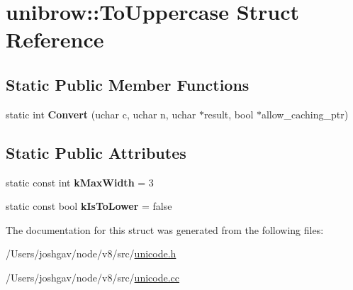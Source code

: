 \hypertarget{structunibrow_1_1_to_uppercase}{}\section{unibrow\+:\+:To\+Uppercase Struct Reference}
\label{structunibrow_1_1_to_uppercase}
\subsection*{Static Public Member Functions}
\begin{DoxyCompactItemize}
\item 
static int {\bfseries Convert} (uchar c, uchar n, uchar $\ast$result, bool $\ast$allow\+\_\+caching\+\_\+ptr)\hypertarget{structunibrow_1_1_to_uppercase_af0d9d46393e190811df7aee125999757}{}\label{structunibrow_1_1_to_uppercase_af0d9d46393e190811df7aee125999757}

\end{DoxyCompactItemize}
\subsection*{Static Public Attributes}
\begin{DoxyCompactItemize}
\item 
static const int {\bfseries k\+Max\+Width} = 3\hypertarget{structunibrow_1_1_to_uppercase_aeb0ac39ab96dff4ae331cee78b32a30f}{}\label{structunibrow_1_1_to_uppercase_aeb0ac39ab96dff4ae331cee78b32a30f}

\item 
static const bool {\bfseries k\+Is\+To\+Lower} = false\hypertarget{structunibrow_1_1_to_uppercase_a531f28567099ef97da4686bd9938ff54}{}\label{structunibrow_1_1_to_uppercase_a531f28567099ef97da4686bd9938ff54}

\end{DoxyCompactItemize}


The documentation for this struct was generated from the following files\+:\begin{DoxyCompactItemize}
\item 
/\+Users/joshgav/node/v8/src/\hyperlink{unicode_8h}{unicode.\+h}\item 
/\+Users/joshgav/node/v8/src/\hyperlink{unicode_8cc}{unicode.\+cc}\end{DoxyCompactItemize}

